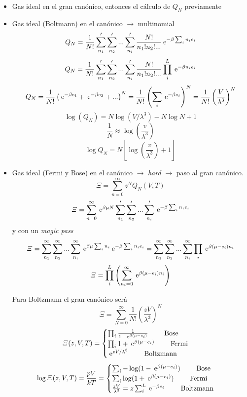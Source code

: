 \documentclass[10pt,oneside]{CBFT_book}
\begin{document}
\begin{itemize}
 \item Gas ideal en el gran canónico, entonces el cálculo de $Q_N$ previamente
 \item Gas ideal (Boltmann) en el canónico $\to$ multinomial
\[
	Q_N = \frac{1}{N!} \sum_{n_1}' \sum_{n_2}' ...  \sum_{n_i}' \frac{N!}{n_1!n_2!...}
	\:\mathrm{e}^{ -\beta \sum_i n_i e_i }
\]
\[
	Q_N = \frac{1}{N!} \sum_{n_1}' \sum_{n_2}' ...  \sum_{n_i}' \frac{N!}{n_1!n_2!...}
	\prod_i^L \:\mathrm{e}^{ -\beta n_i e_i }
\]
\[
	Q_N = \frac{1}{N!} \left( \:\mathrm{e}^{-\beta e_1 } + \:\mathrm{e}^{ -\beta e_2 } + ... \right)^N
	= \frac{1}{N!} \left( \sum_i \:\mathrm{e}^{-\beta e_i } \right)^N =
	\frac{1}{N!} \left( \frac{V}{\lambda^3} \right)^N 
\]
\[
	\log (Q_N) = N \log ( V/\lambda^3 ) - N \log N + 1
\]
\[
	\frac{1}{N} \approx \log \left( \frac{v}{\lambda^3} \right)
\]
\[
	\boxed{ \log Q_N = N \left[ \log \left( \frac{v}{\lambda^3} \right) + 1 \right]}
\]
\item Gas ideal (Fermi y Bose) en el canónico $\to$ {\it hard} $\to$ paso al gran canónico.
\[
	\Xi = \sum_{n=0}^\infty z^N Q_N(V,T)
\]
\[
	\Xi = \sum_{n=0}^\infty \:\mathrm{e}^{\beta \mu N} \sum_{n_1}' \sum_{n_2}' ...  \sum_{n_i}' 
	\:\mathrm{e}^{ -\beta \sum_i n_i e_i }
\]
y con un {\it magic pass}
\[
	\Xi =  \sum_{n_1}^\infty \sum_{n_2}^\infty ... \sum_{n_i}^\infty
	\:\mathrm{e}^{ \beta \mu \sum_i n_i } \:\mathrm{e}^{ -\beta \sum_i n_i e_i }
	= \sum_{n_1}^\infty \sum_{n_2}^\infty  ... \sum_{n_i}^\infty \prod_i \:\mathrm{e}^{\beta(\mu -e_i )n_i}
\]
\[
	\Xi =  \prod_i^L \left( \sum_{n_i=0}^\infty \:\mathrm{e}^{\beta(\mu -e_i )n_i} \right)
\]

Para Boltzmann el gran canónico será 
\[
	\Xi = \sum_{N=0}^\infty \frac{1}{N!} \left( \frac{zV}{\lambda^3}\right)^N
\]
\[
	\Xi(z,V,T) = \begin{cases}
	              \prod_i \frac{1}{1- \:\mathrm{e}^{\beta(\mu - e_i)}} \qquad \text{ Bose } \\
	              \prod_i 1 + \:\mathrm{e}^{\beta(\mu - e_i)} \qquad \text{ Fermi } \\
	              \:\mathrm{e}^{zV/\lambda^3} \qquad \text{ Boltzmann }
	             \end{cases}
\]
\[
	\log \Xi(z,V,T) = \frac{pV}{kT} = \begin{cases}
	              \sum_i -\log (1 - \:\mathrm{e}^{\beta(\mu - e_i)} ) \qquad \text{ Bose } \\
	              \sum_i \log (1 + \:\mathrm{e}^{\beta(\mu - e_i)} )  \qquad \text{ Fermi } \\
	              \frac{zV}{\lambda^3} = z\sum_i^L \:\mathrm{e}^{-\beta e_i} \qquad \text{ Boltzmann }
	             \end{cases}
\]


\end{itemize}
\end{document}
